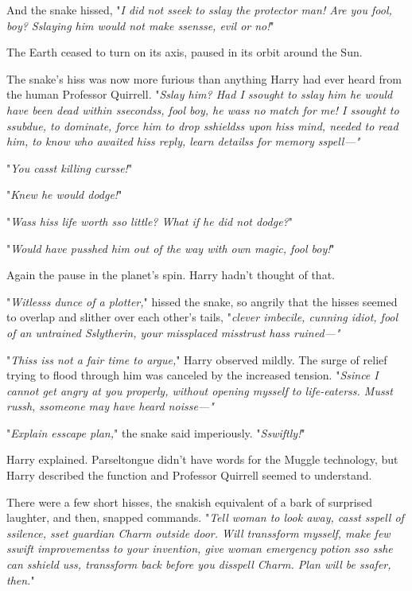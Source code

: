 And the snake hissed, "\emph{I did not sseek to sslay the protector man! Are 
you fool, boy? Sslaying him would not make ssensse, evil or no!}"

The Earth ceased to turn on its axis, paused in its orbit around the Sun.

The snake's hiss was now more furious than anything Harry had ever heard from 
the human Professor Quirrell. "\emph{Sslay him? Had I ssought to sslay him he 
would have been dead within ssecondss, fool boy, he wass no match for me! I 
ssought to ssubdue, to dominate, force him to drop sshieldss upon hiss mind, 
needed to read him, to know who awaited hiss reply, learn detailss for memory 
sspell---"}

"\emph{You casst killing cursse!}"

"\emph{Knew he would dodge!}"

"\emph{Wass hiss life worth sso little? What if he did not dodge?}"

"\emph{Would have pusshed him out of the way with own magic, fool boy!}"

Again the pause in the planet's spin. Harry hadn't thought of that.

"\emph{Witlesss dunce of a plotter,}" hissed the snake, so angrily that the 
hisses seemed to overlap and slither over each other's tails, "\emph{clever 
imbecile, cunning idiot, fool of an untrained Sslytherin, your missplaced 
misstrust hass ruined---"}

"\emph{Thiss iss not a fair time to argue,}" Harry observed mildly. The surge 
of relief trying to flood through him was canceled by the increased tension. 
"\emph{Ssince I cannot get angry at you properly, without opening mysself to 
life-eaterss. Musst russh, ssomeone may have heard noisse---"}

"\emph{Explain esscape plan,}" the snake said imperiously. "\emph{Sswiftly!}"

Harry explained. Parseltongue didn't have words for the Muggle technology, but 
Harry described the function and Professor Quirrell seemed to understand.

There were a few short hisses, the snakish equivalent of a bark of surprised 
laughter, and then, snapped commands. "\emph{Tell woman to look away, casst 
sspell of ssilence, sset guardian Charm outside door. Will transsform mysself, 
make few sswift improvementss to your invention, give woman emergency potion 
sso sshe can sshield uss, transsform back before you disspell Charm. Plan will 
be ssafer, then.}"


